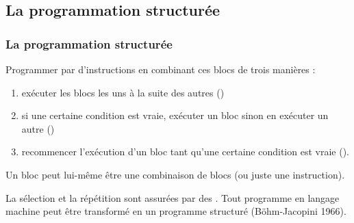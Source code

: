 \documentclass[xcolor=svgnames]{beamer}
\begin{document}
\subsection{La programmation structurée}
\begin{frame}
  \frametitle{La programmation structurée}
  
  \begin{definition}
    Programmer par  d'instructions en combinant ces blocs de trois manières :\pause
    \begin{enumerate}
    \item exécuter les blocs les uns à la suite des autres ()\pause
    \item si une certaine condition est vraie, exécuter un bloc sinon
      en exécuter un autre ()\pause
    \item recommencer l'exécution d'un bloc tant qu'une certaine
      condition est vraie ().\pause
    \end{enumerate}
    Un bloc peut lui-même être une combinaison de blocs (ou juste une instruction).
  \end{definition}
\pause La sélection et la répétition sont assurées par des
. 
  \pause Tout programme en langage machine peut
  être transformé en un programme structuré (Böhm-Jacopini 1966).
\end{frame}
\end{document}

